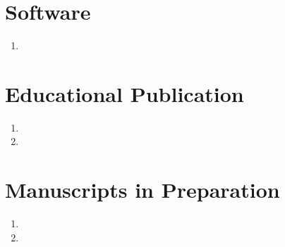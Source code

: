 \documentclass[11pt,a4paper]{article}
\begin{document}
\section*{Software}
\begin{enumerate}
    \item {}
\end{enumerate}

\section*{Educational Publication}
\begin{enumerate}
    \item {}
    \item {}
\end{enumerate}

\section*{Manuscripts in Preparation}
\begin{enumerate}
    \item {}
    \item {}
\end{enumerate}
\end{document}
